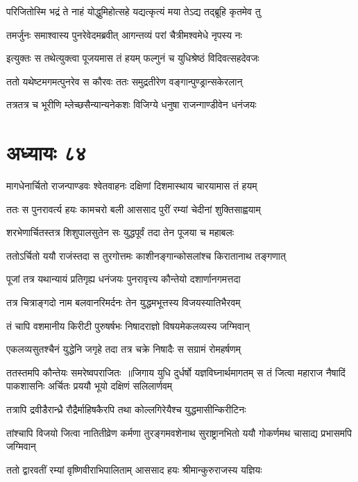 \twolineshloka
{परिजितोस्मि भद्रं ते नाहं योद्धुमिहोत्सहे}
{यद्यत्कृत्यं मया तेऽद्य तद्ब्रूहि कृतमेव तु}


\twolineshloka
{तमर्जुनः समाश्वास्य पुनरेवेदमब्रवीत्}
{आगन्तव्यं परां चैत्रीमश्वमेधे नृपस्य नः}


\twolineshloka
{इत्युक्तः स तथेत्युक्त्वा पूजयमास तं हयम्}
{फल्गुनं च युधिश्रेष्ठं विदिवत्सहदेवजः}


\twolineshloka
{ततो यथेष्टमगमत्पुनरेव स कौरवः}
{ततः समुद्रतीरेण वङ्गान्पुण्ड्रान्सकेरलान्}


\twolineshloka
{तत्रतत्र च भूरीणि म्लेच्छसैन्यान्यनेकशः}
{विजिग्ये धनुषा राजन्गाण्डीवेन धनंजयः}


\chapter{अध्यायः ८४}
\twolineshloka
{मागधेनार्चितो राजन्पाण्डवः श्वेतवाहनः}
{दक्षिणां दिशमास्थाय चारयामास तं हयम्}


\twolineshloka
{ततः स पुनरावर्त्य हयः कामचरो बली}
{आससाद पुरीं रम्यां चेदीनां शुक्तिसाह्वयाम्}


\twolineshloka
{शरभेणार्चितस्तत्र शिशुपालसुतेन सः}
{युद्धपूर्वं तदा तेन पूजया च महाबलः}


\twolineshloka
{ततोऽर्चितो ययौ राजंस्तदा स तुरगोत्तमः}
{काशीनङ्गान्कोसलांश्च किरातानाथ तङ्गणात्}


\twolineshloka
{पूजां तत्र यथान्यायं प्रतिगृह्य धनंजयः}
{पुनरावृत्त्य कौन्तेयो दशार्णानगमत्तदा}


\twolineshloka
{तत्र चित्राङ्गदो नाम बलवानरिमर्दनः}
{तेन युद्धमभूत्तस्य विजयस्यातिभैरवम्}


\twolineshloka
{तं चापि वशमानीय किरीटी पुरुषर्षभः}
{निषादराज्ञो विषयमेकलव्यस्य जग्मिवान्}


\twolineshloka
{एकलव्यसुतश्चैनं युद्धेनि जगृहे तदा}
{तत्र चक्रे निषादैः स सग्रामं रोमहर्षणम्}


ततस्तमपि कौन्तेयः समरेष्वपराजितः ॥जिगाय युधि दुर्धर्षो यज्ञविघ्नार्थमागतम्
\twolineshloka
{स तं जित्वा महाराज नैषादिं पाकशासनिः}
{अर्चितः प्रययौ भूयो दक्षिणं सलिलार्णवम्}


\twolineshloka
{तत्रापि द्रवीडैरान्ध्रै रौद्रैर्माहिषकैरपि}
{तथा कोल्लगिरेयैश्च युद्धमासीन्किरीटिनः}


\threelineshloka
{तांश्चापि विजयो जित्वा नातितीव्रेण कर्मणा}
{तुरङ्गमवशेनाथ सुराष्ट्रानभितो ययौ}
{गोकर्णमथ चासाद्य प्रभासमपि जग्मिवान्}


\twolineshloka
{ततो द्वारवतीं रम्यां वृष्णिवीराभिपालिताम्}
{आससाद हयः श्रीमान्कुरुराजस्य यज्ञियः}


